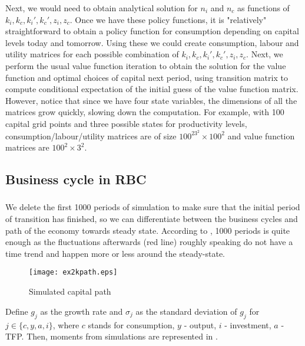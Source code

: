 \documentclass[]{article}
\begin{document}
Next, we would need to obtain analytical solution for $n_i$ and $n_c$ as functions of $k_i, k_c, k_i', k_c', z_i, z_c$. Once we have these policy functions, it is "relatively" straightforward to obtain a policy function for consumption depending on capital levels today and tomorrow. Using these we could create consumption, labour and utility matrices for each possible combination of $k_i, k_c, k_i', k_c', z_i, z_c$. Next, we perform the usual value function iteration to obtain the solution for the value function and optimal choices of capital next period, using transition matrix to compute conditional expectation of the initial guess of the value function matrix. However, notice that since we have four state variables, the dimensions of all the matrices grow quickly, slowing down the computation. For example, with 100 capital grid points and three possible states for productivity levels, consumption/labour/utility matrices are of size $100^23^2\times100^2$ and value function matrices are $100^2\times3^2$.

\subsection{Business cycle in RBC}

\subsubsection{}
We delete the first 1000 periods of simulation to make sure that the initial period of transition has finished, so we can differentiate between the business cycles and path of the economy towards steady state. According to , 1000 periods is quite enough as the fluctuations afterwards (red line) roughly speaking do not have a time trend and happen more or less around the steady-state.
\begin{figure}[h]
	\centering
	\texttt{[image: ex2kpath.eps]}
	\caption{Simulated capital path}
	\label{fig:ex2kpath}
\end{figure}

Define $g_j$ as the growth rate and $\sigma_j$ as the standard deviation of $g_j$ for $j\in\{c,y,a,i\}$, where $c$ stands for consumption, $y$ - output, $i$ - investment, $a$ - TFP. Then, moments from simulations are represented in .
\end{document}
